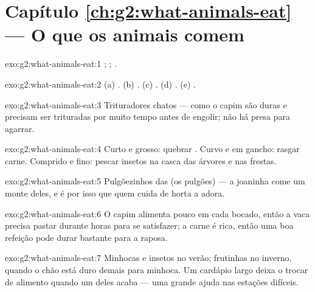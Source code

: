 \section*{Capítulo \ref{ch:g2:what-animals-eat} --- O que os animais comem}

\begin{solution}{exo:g2:what-animals-eat:1}
; ; .
\end{solution}

\begin{solution}{exo:g2:what-animals-eat:2}
(a) . (b) . (c) . (d) . (e)
.
\end{solution}

\begin{solution}{exo:g2:what-animals-eat:3}
Trituradores chatos ---  como o capim são duras e precisam
ser trituradas por muito tempo antes de engolir; não há presa para
agarrar.
\end{solution}

\begin{solution}{exo:g2:what-animals-eat:4}
Curto e grosso: quebrar . Curvo e em gancho: rasgar carne.
Comprido e fino: pescar insetos na casca das árvores e nas frestas.
\end{solution}

\begin{solution}{exo:g2:what-animals-eat:5}
Pulgõezinhos das  (os pulgões) --- a joaninha come um monte
deles, e é por isso que quem cuida de horta a adora.
\end{solution}

\begin{solution}{exo:g2:what-animals-eat:6}
O capim alimenta pouco em cada bocado, então a vaca precisa pastar
durante horas para se satisfazer; a carne é rica, então uma boa
refeição pode durar bastante para a raposa.
\end{solution}

\begin{solution}{exo:g2:what-animals-eat:7}
Minhocas e insetos no verão; frutinhas no inverno, quando o chão
está duro demais para minhoca. Um cardápio largo deixa o 
trocar de alimento quando um deles acaba --- uma grande ajuda nas
estações difíceis.
\end{solution}

